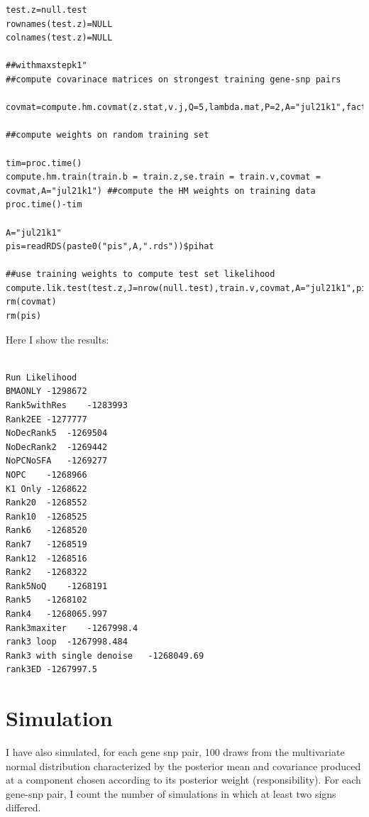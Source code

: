 \documentclass[10pt]{article}
\begin{document}
\begin{itemize}
\begin{verbatim}
test.z=null.test
rownames(test.z)=NULL
colnames(test.z)=NULL

##withmaxstepk1"
##compute covarinace matrices on strongest training gene-snp pairs

covmat=compute.hm.covmat(z.stat,v.j,Q=5,lambda.mat,P=2,A="jul21k1",factor.mat,max.step=max.stepk1)

##compute weights on random training set

tim=proc.time()
compute.hm.train(train.b = train.z,se.train = train.v,covmat = covmat,A="jul21k1") ##compute the HM weights on training data
proc.time()-tim

A="jul21k1"
pis=readRDS(paste0("pis",A,".rds"))$pihat

##use training weights to compute test set likelihood
compute.lik.test(test.z,J=nrow(null.test),train.v,covmat,A="jul21k1",pis) 
rm(covmat)
rm(pis)
\end{verbatim}

Here I show the results:



\begin{verbatim}

Run	Likelihood
BMAONLY	-1298672
Rank5withRes	-1283993
Rank2EE	-1277777
NoDecRank5	-1269504
NoDecRank2	-1269442
NoPCNoSFA	-1269277
NOPC	-1268966
K1 Only	-1268622
Rank20	-1268552
Rank10	-1268525
Rank6	-1268520
Rank7	-1268519
Rank12	-1268516
Rank2	-1268322
Rank5NoQ	-1268191
Rank5	-1268102
Rank4	-1268065.997
Rank3maxiter	-1267998.4
rank3 loop 	-1267998.484
Rank3 with single denoise	-1268049.69
rank3ED	-1267997.5

\end{verbatim}

\section{Simulation}
I have also simulated, for each gene snp pair, 100 draws from the multivariate normal distribution characterized by the posterior mean and covariance produced at a component chosen according to its posterior weight (responsibility). For each gene-snp pair, I count the number of simulations in which at least two signs differed. 


\end{itemize}
\end{document}
